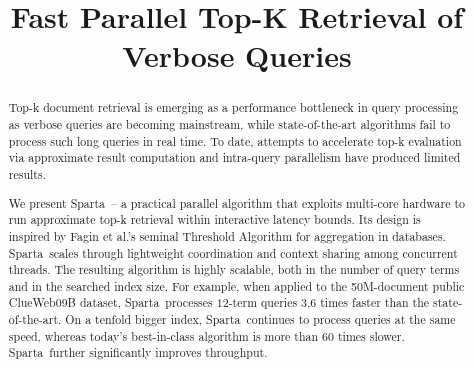 \documentclass[sigconf,anonymous]{acmart}
\begin{document}
\newcommand{\alg}{Sparta}  
\newcommand{\inred}[1]{{\color{red}{#1}}}
\newcommand{\inblue}[1]{{\color{blue}{#1}}}
\newcommand{\remove}[1]{}


\title{Fast Parallel Top-K Retrieval of Verbose Queries}


\author{ }




\begin{abstract}
Top-k document retrieval is emerging as a performance bottleneck in query processing as verbose queries are becoming 
mainstream, while state-of-the-art algorithms fail to process such long queries in real time. To date, attempts to
accelerate top-k evaluation 
via approximate result computation and intra-query parallelism have produced limited results. 

We present \alg\ -- a practical parallel algorithm that exploits multi-core hardware to run approximate top-k retrieval 
within interactive latency bounds. Its design is inspired by  Fagin et al.'s seminal Threshold Algorithm for  aggregation in databases. 
\alg\ scales through lightweight coordination and context sharing among concurrent threads. The resulting algorithm 
is highly scalable, 
both in the number of query terms and in the searched index size. For example, when applied to the 50M-document public ClueWeb09B 
dataset, \alg\  processes $12$-term queries $3.6$ times faster than the state-of-the-art. On a tenfold  bigger index, 
\alg\ continues to process queries at the same speed, whereas today's best-in-class algorithm is more than 60 times slower. 
\alg\ further significantly improves throughput.%
\end{abstract}

\maketitle











  
\end{document}
